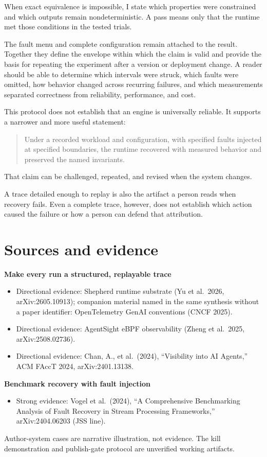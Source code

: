 When exact equivalence is impossible, I state which properties were constrained and which outputs remain nondeterministic. A pass means only that the runtime met those conditions in the tested trials.

The fault menu and complete configuration remain attached to the result. Together they define the envelope within which the claim is valid and provide the basis for repeating the experiment after a version or deployment change. A reader should be able to determine which intervals were struck, which faults were omitted, how behavior changed across recurring failures, and which measurements separated correctness from reliability, performance, and cost.

This protocol does not establish that an engine is universally reliable. It supports a narrower and more useful statement:

\begin{quote}
Under a recorded workload and configuration, with specified faults injected at specified boundaries, the runtime recovered with measured behavior and preserved the named invariants.
\end{quote}

That claim can be challenged, repeated, and revised when the system changes.

A trace detailed enough to replay is also the artifact a person reads when recovery fails. Even a complete trace, however, does not establish which action caused the failure or how a person can defend that attribution.

\section*{Sources and evidence}

\textbf{Make every run a structured, replayable trace}

\begin{itemize}
\tightlist
\item
  Directional evidence: Shepherd runtime substrate (Yu et al.~2026, arXiv:2605.10913); companion material named in the same synthesis without a paper identifier: OpenTelemetry GenAI conventions (CNCF 2025).
\item
  Directional evidence: AgentSight eBPF observability (Zheng et al.~2025, arXiv:2508.02736).
\item
  Directional evidence: Chan, A., et al.~(2024), ``Visibility into AI Agents,'' ACM FAccT 2024, arXiv:2401.13138.
\end{itemize}

\textbf{Benchmark recovery with fault injection}

\begin{itemize}
\tightlist
\item
  Strong evidence: Vogel et al.~(2024), ``A Comprehensive Benchmarking Analysis of Fault Recovery in Stream Processing Frameworks,'' arXiv:2404.06203 (JSS line).
\end{itemize}

Author-system cases are narrative illustration, not evidence. The kill demonstration and publish-gate protocol are unverified working artifacts.

